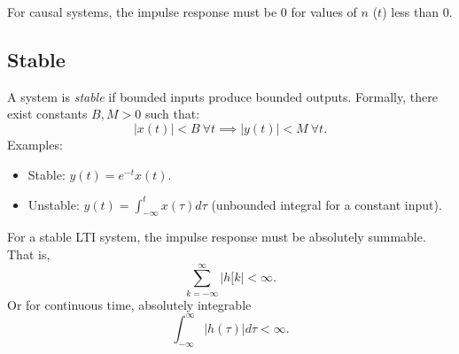 For causal systems, the impulse response must be 0 for values of $n$ ($t$)
less than 0.

\subsection{Stable}
A system is \emph{stable} if bounded inputs produce
bounded outputs. Formally, there exist constants \( B, M > 0 \)
such that:
\[
    |x(t)| < B \ \forall t \implies |y(t)| < M \ \forall t.
\]
Examples:
\begin{itemize}
    \item Stable: \( y(t) = e^{-t}x(t) \).
    \item Unstable: \( y(t) = \int_{-\infty}^t x(\tau) d\tau \)
          (unbounded integral for a constant input).
\end{itemize}

For a stable LTI system, the impulse response must be absolutely summable.
That is,
\begin{equation}
    \sum_{k=-\infty}^{\infty} |h[k| < \infty.
\end{equation}
Or for continuous time, absolutely integrable
\begin{equation}
    \int_{-\infty}^{\infty} |h(\tau)| d\tau < \infty.
\end{equation}